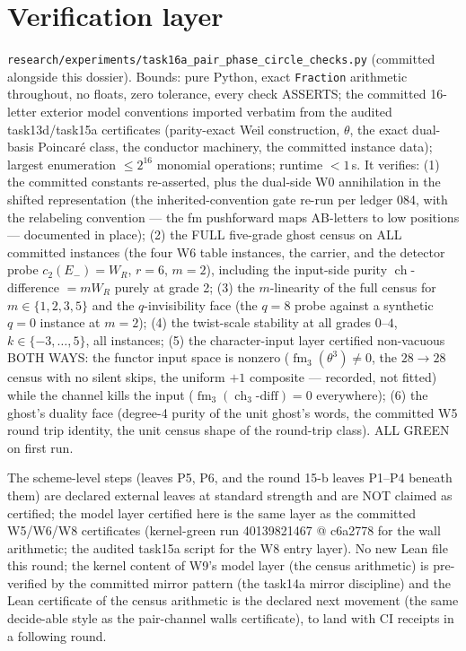 \documentclass[11pt]{article}
\newcommand{\WR}{W_R}
\newcommand{\ch}{\operatorname{ch}}
\newcommand{\fm}{\operatorname{fm}}
\begin{document}
\section{Verification layer}

\texttt{research/experiments/task16a\_pair\_phase\_circle\_checks.py}
(committed alongside this dossier). Bounds: pure Python, exact
\texttt{Fraction} arithmetic throughout, no floats, zero tolerance, every
check ASSERTS; the committed 16-letter exterior model conventions imported
verbatim from the audited task13d/task15a certificates (parity-exact Weil
construction, $\theta$, the exact dual-basis Poincar\'e class, the conductor
machinery, the committed instance data); largest enumeration $\le 2^{16}$
monomial operations; runtime $< 1$\,s. It verifies: (1) the committed
constants re-asserted, plus the dual-side W0 annihilation in the shifted
representation (the inherited-convention gate re-run per ledger 084, with
the relabeling convention --- the fm pushforward maps AB-letters to low
positions --- documented in place); (2) the FULL five-grade ghost census on
ALL committed instances (the four W6 table instances, the carrier, and the
detector probe $c_2(E_-)=\WR$, $r=6$, $m=2$), including the input-side
purity $\ch$-difference $= m\WR$ purely at grade 2; (3) the $m$-linearity of
the full census for $m\in\{1,2,3,5\}$ and the $q$-invisibility face (the
$q=8$ probe against a synthetic $q=0$ instance at $m=2$); (4) the twist-scale
stability at all grades $0$--$4$, $k\in\{-3,\dots,5\}$, all instances; (5)
the character-input layer certified non-vacuous BOTH WAYS: the functor input
space is nonzero ($\fm_3(\theta^3)\ne 0$, the $28\to28$ census with no
silent skips, the uniform $+1$ composite --- recorded, not fitted) while the
channel kills the input ($\fm_3(\ch_3\text{-diff}) = 0$ everywhere); (6) the
ghost's duality face (degree-4 purity of the unit ghost's words, the
committed W5 round trip identity, the unit census shape of the round-trip
class). ALL GREEN on first run.

The scheme-level steps (leaves P5, P6, and the round 15-b leaves P1--P4
beneath them) are declared external leaves at standard strength and are NOT
claimed as certified; the model layer certified here is the same layer as
the committed W5/W6/W8 certificates (kernel-green run 40139821467 @ c6a2778
for the wall arithmetic; the audited task15a script for the W8 entry layer).
No new Lean file this round; the kernel content of W9's model layer (the
census arithmetic) is pre-verified by the committed mirror pattern
(the task14a mirror discipline) and the Lean certificate of the census
arithmetic is the declared next movement (the same decide-able style as the
pair-channel walls certificate), to land with CI receipts in a following
round.
\end{document}

